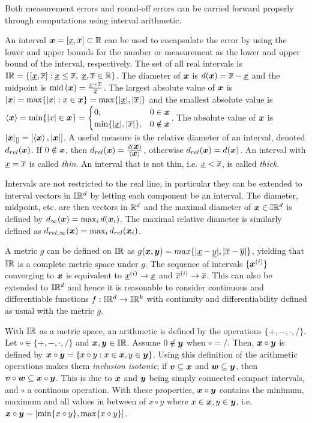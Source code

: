 \documentclass[../rigorous-computation.tex]{subfile}
\begin{document}
  Both measurement errors and round-off errors can be carried forward properly through computations using interval arithmetic.

  An interval $\x = [\ul x, \ol x] \subset \Rz$ can be used to encapsulate the error by using the lower and upper bounds for the number or measurement as the lower and upper bound of the interval, respectively.
  The set of all real intervals is $\mathbb{I} \mathbb{R} = \{[\underline x, \overline x] : \underline x \le \overline x,\; \underline x, \overline x \in \mathbb{R} \}$.
  The diameter of $\x$ is $d(\x) = \ol x - \ul x$ and the midpoint is $\Imid(\x) = \frac{\ul x + \ol x}{2}$.
  The largest absolute value of $\x$ is 
  $|\x| = \max \{ |x| : x \in \x \} = \max \{ |\ul x|, |\ol x| \}$ and 
  the smallest absolute value is \linebreak 
  $\left< \x \right> = \min \{ |x| \in \x \} = \begin{cases} 0,& 0 \in \x \\ \min \{ |\ul x|, |\ol x| \},& 0 \notin \x \end{cases}$.
  The absolute value of $\x$ is $|\x|_{[]} = [\left< \x \right>, |\x|]$.
  A useful measure is the relative diameter of an interval, denoted $d_{rel}(\x)$.
  If $0 \notin \x$, then $\drel(\x) = \frac{d(\x)}{\left< \x \right>}$, 
  otherwise $\drel(\x) = d(\x)$.
  An interval with $\underline x = \overline x$ is called \textit{thin}.
  An interval that is not thin, i.e. $\underline x < \overline x$, is called \textit{thick}.

  Intervals are not restricted to the real line, 
  in particular they can be extended to interval vectors in $\mathbb{I}\mathbb{R}^d$ by 
  letting each component be an interval.
  The diameter, midpoint, etc. are then vectors in $\mathbb{R}^d$ and 
  the maximal diameter of $\x \in \Iz \Rz^d$ is defined by $\dm(\x) = \max_i d(\x_i)$.
  The maximal relative diameter is similarly defined as $\dmrel(\x) = \max_i \drel(\x_i)$.

  A metric $g$ can be defined on $\mathbb{I} \mathbb{R}$ as 
  $g(\x,\y) = max\{|\ul x - \ul y|, |\ol x - \ol y|\}$, 
  yielding that $\mathbb{I} \mathbb{R}$ is a complete metric space under $g$.
  The sequence of intervals $\{\x^{(i)}\}$ converging to $\x$ is 
  equivalent to $\underline x^{(i)} \to \underline x$ and $\overline x^{(i)} \to \overline x$.
  This can also be extended to $\mathbb{I} \mathbb{R}^d$ and 
  hence it is reasonable to consider continuous and differentiable functions 
  $f : \mathbb{I} \mathbb{R}^d \to \mathbb{I} \mathbb{R}^k$ with continuity and differentiability 
  defined as usual with the metric $g$.

  With $\mathbb{I} \mathbb{R}$ as a metric space, an arithmetic is defined by 
  the operations $\{+,-,\cdot,/\}$.
  Let $\circ \in \{+,-,\cdot,/\}$ and $\x, \y \in \Iz \Rz$.
  Assume $0 \notin \y$ when $\circ = /$.
  Then, $\x \circ \y$ is defined by 
  $\x \circ \y = \{ x \circ y : x \in \x, y \in \y \}$.
  Using this definition of the arithmetic operations makes them \textit{inclusion isotonic}; 
  if $\vv \subseteq \x$ and $\w \subseteq \y$, then $\vv \circ \w \subseteq \x \circ \y$.
  This is due to $\x$ and $\y$ being simply connected compact intervals, 
  and $\circ$ a continous operation.
  With these properties, $\x \circ \y$ contains the minimum, maximum and 
  all values in between of $x \circ y$ where $x \in \x, y \in \y$, 
  i.e. $\x \circ \y = [\min\{ x \circ y \}, \max\{ x \circ y \}]$.
\end{document}
